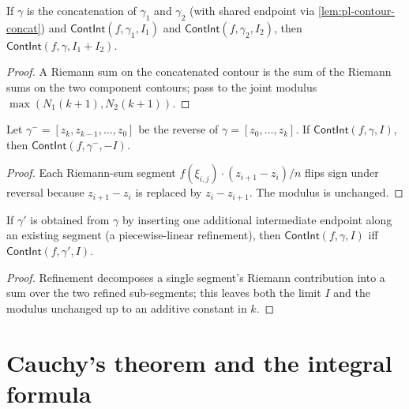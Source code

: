 \begin{lemma}
\label{lem:cont-int-concat}
If \(\gamma\) is the concatenation of \(\gamma_1\) and \(\gamma_2\) (with shared endpoint via \autoref{lem:pl-contour-concat}) and \(\mathsf{ContInt}(f, \gamma_1, I_1)\) and \(\mathsf{ContInt}(f, \gamma_2, I_2)\), then \(\mathsf{ContInt}(f, \gamma, I_1 + I_2)\).
\end{lemma}
\begin{proof}
A Riemann sum on the concatenated contour is the sum of the Riemann sums on the two component contours; pass to the joint modulus \(\max(N_1(k+1), N_2(k+1))\).
\end{proof}

\begin{lemma}
\label{lem:cont-int-reversal}
Let \(\gamma^- = [z_k, z_{k-1}, \ldots, z_0]\) be the reverse of \(\gamma = [z_0, \ldots, z_k]\). If \(\mathsf{ContInt}(f, \gamma, I)\), then \(\mathsf{ContInt}(f, \gamma^-, -I)\).
\end{lemma}
\begin{proof}
Each Riemann-sum segment \(f(\xi_{i,j}) \cdot (z_{i+1} - z_i)/n\) flips sign under reversal because \(z_{i+1} - z_i\) is replaced by \(z_i - z_{i+1}\). The modulus is unchanged.
\end{proof}

\begin{lemma}
\label{lem:cont-int-reparameterization}
If \(\gamma'\) is obtained from \(\gamma\) by inserting one additional intermediate endpoint along an existing segment (a piecewise-linear refinement), then \(\mathsf{ContInt}(f, \gamma, I)\) iff \(\mathsf{ContInt}(f, \gamma', I)\).
\end{lemma}
\begin{proof}
Refinement decomposes a single segment's Riemann contribution into a sum over the two refined sub-segments; this leaves both the limit \(I\) and the modulus unchanged up to an additive constant in \(k\).
\end{proof}

\section{Cauchy's theorem and the integral formula}

